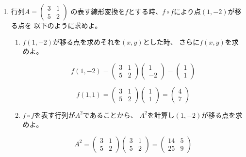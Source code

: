 \documentclass[10pt,b5paper]{ltjsarticle}
\begin{document}
\begin{enumerate}
\begin{enumerate}
       \end{enumerate}
       \hrulefill
 \item 行列$A=\begin{pmatrix} 3&1\\ 5&2\end{pmatrix}$
       の表す線形変換を$f$とする時、$f\circ f$により点$(1,-2)$が移る点を
       以下のように求めよ。
       \begin{enumerate}
        \item $f(1,-2)$が移る点を求めそれを$(x,y)$とした時、
              さらに$f(x,y)$を求めよ。

              \dotfill

              \begin{equation}
               f(1, -2) =
                \begin{pmatrix} 3&1\\ 5&2\end{pmatrix}
                \begin{pmatrix} 1\\ -2\end{pmatrix}
                =\begin{pmatrix} 1\\ 1\end{pmatrix}
              \end{equation}

              \begin{equation}
               f(1, 1) =
                \begin{pmatrix} 3&1\\ 5&2\end{pmatrix}
                \begin{pmatrix} 1\\ 1\end{pmatrix}
                =\begin{pmatrix} 4\\ 7\end{pmatrix}
              \end{equation}

              \hrulefill
        \item $f\circ f$を表す行列が$A^2$であることから、
              $A^2$を計算し$(1,-2)$が移る点を求めよ。

              \dotfill

              \begin{equation}
               A^2 =
                \begin{pmatrix} 3&1\\ 5&2\end{pmatrix}
                \begin{pmatrix} 3&1\\ 5&2\end{pmatrix}
                = \begin{pmatrix} 14&5\\ 25&9\end{pmatrix}
              \end{equation}


\end{enumerate}
\end{enumerate}
\end{document}
